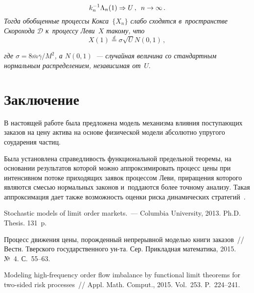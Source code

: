 \begin{multicols}{2}
\noindent
\begin{equation*}
k_n^{-1}\Lambda_n(1)\Rightarrow U\,,\enskip n\rightarrow\infty\,.
\end{equation*}
\textit{Тогда обобщенные процессы Кокса~$\{X_n\}$ слабо сходятся в~пространстве 
Скорохода $\mathcal{D}$ к~процессу Леви~$X$ такому, что}
\begin{equation*}
X(1) \stackrel{d}=\sigma\sqrt{U}N(0,1)\,,
\end{equation*}


\noindent
\textit{где $\sigma = {8\overline{m}\overline{\gamma}}/{M^2}$, а $N(0,1)$~--- 
случайная величина со стандартным нормальным распределением, независимая от}~$U$. 


\section{Заключение}

В настоящей работе была предложена модель механизма влияния по\-сту\-па\-ющих 
заказов на цену актива на основе физической модели абсолютно упругого 
соударения час\-тиц. 

Была установлена справедливость функциональной предельной 
тео\-ре\-мы, на основании результатов которой можно аппроксимировать процесс 
цены при интенсивном потоке приходящих заявок процессом Леви, приращения 
которого являются смесью нормальных законов и~поддаются более точному анализу. 
Такая аппроксимация дает также воз\-мож\-ность оценки риска динамических
 стратегий~\cite{six}.



    {\small\frenchspacing
 {%
 \begin{thebibliography}{9}
 Stochastic models of limit order markets.~--- 
Columbia University, 2013. Ph.D. Thesis. 131~p.

Процесс движения цены, порожденный непрерывной моделью книги заказов~// 
Вестн. Тверского государственного ун-та. Сер. Прикладная математика, 2015. 
№~4. С.~55--63.

Modeling high-frequency order flow imbalance by functional limit theorems for 
two-sided risk processes~// Appl. Math. Comput., 2015. Vol.~253. P.~224--241.


\end{thebibliography}}}
\end{multicols}
